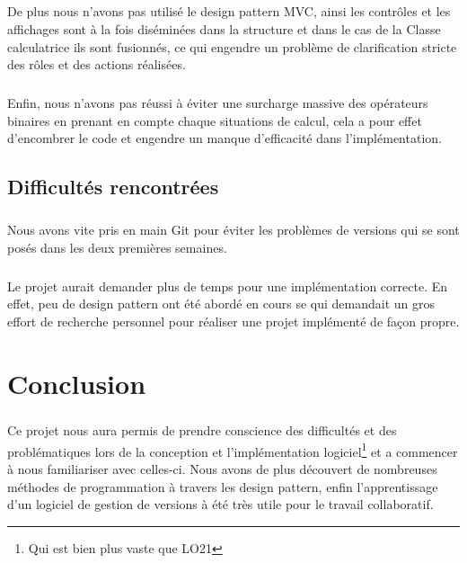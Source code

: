 \documentclass[a4paper,11pt]{report}
\begin{document}
		\paragraph{}De plus nous n'avons pas utilisé le design pattern MVC, ainsi les contrôles et les affichages sont à la fois diséminées dans la structure et dans le cas de la Classe calculatrice ils sont fusionnés, ce qui engendre un problème de clarification stricte des rôles et des actions réalisées.

		\paragraph{}Enfin, nous n'avons pas réussi à éviter une surcharge massive des opérateurs binaires en prenant en compte chaque situations de calcul, cela a pour effet d'encombrer le code et engendre un manque d'efficacité dans l'implémentation.
		
	\section{Difficultés rencontrées}
		\paragraph{}Nous avons vite pris en main Git pour éviter les problèmes de versions qui se sont posés dans les deux premières semaines.
		
		\paragraph{}Le projet aurait demander plus de temps pour une implémentation correcte. En effet, peu de design pattern ont été abordé en cours se qui demandait un gros effort de recherche personnel pour réaliser une projet implémenté de façon propre.
		
\chapter*{Conclusion}
	\paragraph{}Ce projet nous aura permis de prendre conscience des difficultés et des problématiques lors de la conception et l'implémentation logiciel\footnote{Qui est bien plus vaste que LO21} et a commencer à nous familiariser avec celles-ci. Nous avons de plus découvert de nombreuses méthodes de programmation à travers les design pattern, enfin l'apprentissage d'un logiciel de gestion de versions à été très utile pour le travail collaboratif.

\end{document}
